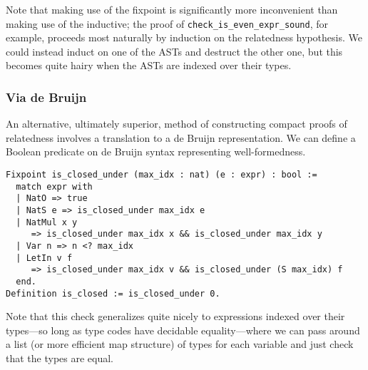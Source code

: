 Note that making use of the fixpoint is significantly more inconvenient than making use of the inductive; the proof of \texttt{check_is_even_expr_sound}, for example, proceeds most naturally by induction on the relatedness hypothesis.
We could instead induct on one of the ASTs and destruct the other one, but this becomes quite hairy when the ASTs are indexed over their types.



\subsubsection{Via de Bruijn} \label{sec:wf:perf:de-bruijn}

An alternative, ultimately superior, method of constructing compact proofs of relatedness involves a translation to a de Bruijn representation.
We can define a Boolean predicate on de Bruijn syntax representing well-formedness.
\begin{verbatim}
Fixpoint is_closed_under (max_idx : nat) (e : expr) : bool :=
  match expr with
  | NatO => true
  | NatS e => is_closed_under max_idx e
  | NatMul x y
     => is_closed_under max_idx x && is_closed_under max_idx y
  | Var n => n <? max_idx
  | LetIn v f
     => is_closed_under max_idx v && is_closed_under (S max_idx) f
  end.
Definition is_closed := is_closed_under 0.
\end{verbatim}
Note that this check generalizes quite nicely to expressions indexed over their types---so long as type codes have decidable equality---where we can pass around a list (or more efficient map structure) of types for each variable and just check that the types are equal.

